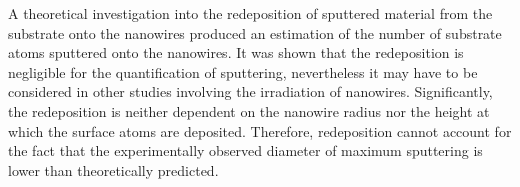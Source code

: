 A theoretical investigation into the redeposition of sputtered material from the substrate onto the nanowires produced an estimation of the number of substrate atoms sputtered onto the nanowires. It was shown that the redeposition is negligible for the quantification of sputtering, nevertheless it may have to be considered in other studies involving the irradiation of nanowires. Significantly, the redeposition is neither dependent on the nanowire radius nor the height at which the surface atoms are deposited. Therefore, redeposition cannot account for the fact that the experimentally observed diameter of maximum sputtering is lower than theoretically predicted.
